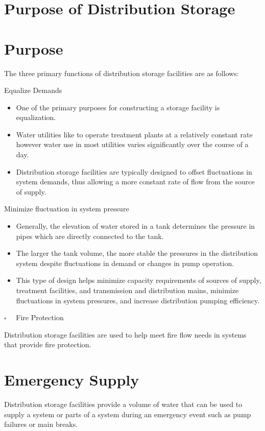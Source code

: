 \documentclass[10pt]{article}
\begin{document}
\section{Purpose of Distribution Storage}
\section{Purpose}
The three primary functions of distribution storage facilities are as follows:

Equalize Demands

\begin{itemize}
  \item One of the primary purposes for constructing a storage facility is equalization.

  \item Water utilities like to operate treatment plants at a relatively constant rate however water use in most utilities varies significantly over the course of a day.

  \item Distribution storage facilities are typically designed to offset fluctuations in system demands, thus allowing a more constant rate of flow from the source of supply.

\end{itemize}
Minimize fluctuation in system pressure

\begin{itemize}
  \item Generally, the elevation of water stored in a tank determines the pressure in pipes which are directly connected to the tank.

  \item The larger the tank volume, the more stable the pressures in the distribution system despite fluctuations in demand or changes in pump operation.

  \item This type of design helps minimize capacity requirements of sources of supply, treatment facilities, and transmission and distribution mains, minimize fluctuations in system pressures, and increase distribution pumping efficiency.

\end{itemize}
$\square \quad$ Fire Protection

Distribution storage facilities are used to help meet fire flow needs in systems that provide fire protection.

\section{Emergency Supply}
Distribution storage facilities provide a volume of water that can be used to supply a system or parts of a system during an emergency event such as pump failures or main breaks.
\end{document}
